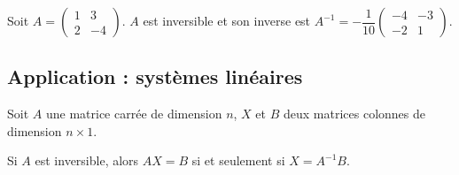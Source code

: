 \documentclass[11pt,fleqn]{book} %
\begin{document}
\begin{example}Soit $A=\begin{pmatrix} 1 & 3 \\ 2 & -4\end{pmatrix}$. $A$ est inversible et son inverse est $A^{-1}=-\dfrac{1}{10}\begin{pmatrix}-4 & -3 \\ -2 & 1\end{pmatrix}$.\end{example}


\subsection{Application : systèmes linéaires}

\begin{proposition}Soit $A$ une matrice carrée de dimension $n$, $X$ et $B$ deux matrices colonnes de dimension $n \times 1$.

Si $A$ est inversible, alors $AX = B$ si et seulement si $X=A^{-1}B$.\end{proposition}
\end{document}
